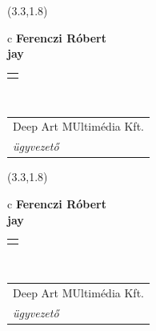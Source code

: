 \documentclass[11pt]{article}
\begin{document}
\makebox(3.3,1.8){
  \renewcommand\arraystretch{1.3}
  \begin{tabular}[c]{c}
    \hspace{8.5mm}
    \LARGE\bf{ Ferenczi Róbert }\\
    \hspace{8.5mm}
    \Large{ jay }\\
    \renewcommand\arraystretch{3}
    \begin{tabular}[c]{c}
      \centering
      \fontfamily{phv}\selectfont{
        \textbf{
          \textsc{
            \scriptsize{
            \color{Dark}{ Ismerkedő }\color{Bright}{ Webmester }\color{Bright}{ Sminkmester }\color{Bright}{ Programozó }
            }
          }
        }
      }
    \end{tabular}
    \\
    \renewcommand\arraystretch{1}
    \begin{tabular}{p{3.3in}}
      \hspace{.7cm}Deep Art MUltimédia Kft.\\
      \hspace{.7cm}\emph{ ügyvezető }\\
    \end{tabular}
  \end{tabular}
}

\makebox(3.3,1.8){
  \renewcommand\arraystretch{1.3}
  \begin{tabular}[c]{c}
    \hspace{8.5mm}
    \LARGE\bf{ Ferenczi Róbert }\\
    \hspace{8.5mm}
    \Large{ jay }\\
    \renewcommand\arraystretch{3}
    \begin{tabular}[c]{c}
      \centering
      \fontfamily{phv}\selectfont{
        \textbf{
          \textsc{
            \scriptsize{
            \color{Dark}{ Ismerkedő }\color{Bright}{ Webmester }\color{Bright}{ Sminkmester }\color{Bright}{ Programozó }
            }
          }
        }
      }
    \end{tabular}
    \\
    \renewcommand\arraystretch{1}
    \begin{tabular}{p{3.3in}}
      \hspace{.7cm}Deep Art MUltimédia Kft.\\
      \hspace{.7cm}\emph{ ügyvezető }\\
    \end{tabular}
  \end{tabular}
}
\end{document}
